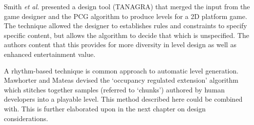 \documentclass[11pt, a4paper, oneside]{report} %
\begin{document}
Smith \textit{et al.} \@\cite{smith2011tanagra} presented a design tool
(TANAGRA) that merged the input from the game designer and the PCG algorithm to
produce levels for a 2D platform game. The technique allowed the designer to
establishes rules and constraints to specify specific content, but allows the
algorithm to decide that which is unspecified. The authors content that this
provides for more diversity in level design as well as enhanced entertainment
value.

A rhythm-based technique is common approach to automatic level generation.
Mawhorter and Mateas \cite{mawhorter2010procedural} devised the `occupancy
regulated extension' algorithm which stitches together samples (referred to
`chunks') authored by human developers into a playable level. This method
described here could be combined with. This is further elaborated upon in the
next chapter on design considerations.









\end{document}
